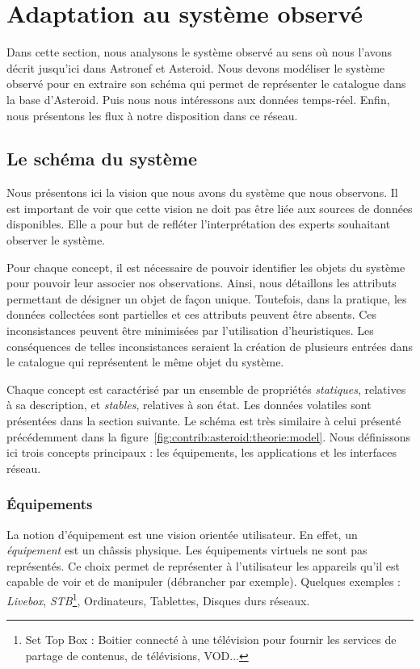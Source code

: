 \section{Adaptation au système observé}\label{sec:valid:domvision:systeme}
Dans cette section, nous analysons le système observé au sens où nous l'avons décrit jusqu'ici dans Astronef et Asteroid. Nous devons modéliser le système observé pour en extraire son schéma qui permet de représenter le catalogue dans la base d'Asteroid. Puis nous nous intéressons aux données temps-réel. Enfin, nous présentons les flux à notre disposition dans ce réseau.

\subsection{Le schéma du système}
Nous présentons ici la vision que nous avons du système que nous observons. Il est important de voir que cette vision ne doit pas être liée aux sources de données disponibles. Elle a pour but de refléter l'interprétation des experts souhaitant observer le système.

Pour chaque concept, il est nécessaire de pouvoir identifier les objets du système pour pouvoir leur associer nos observations. Ainsi, nous détaillons les attributs permettant de désigner un objet de façon unique. Toutefois, dans la pratique, les données collectées sont partielles et ces attributs peuvent être absents. Ces inconsistances peuvent être minimisées par l'utilisation d'heuristiques. Les conséquences de telles inconsistances seraient la création de plusieurs entrées dans le catalogue qui représentent le même objet du système.

Chaque concept est caractérisé par un ensemble de propriétés \textit{statiques}, relatives à sa description, et \textit{stables}, relatives à son état. Les données volatiles sont présentées dans la section suivante. Le schéma est très similaire à celui présenté précédemment dans la figure~\ref{fig:contrib:asteroid:theorie:model}. Nous définissons ici trois concepts principaux : les équipements, les applications et les interfaces réseau.

\subsubsection{Équipements}
La notion d'équipement est une vision orientée utilisateur. En effet, un \textit{équipement} est un châssis physique. Les équipements virtuels ne sont pas représentés. Ce choix permet de représenter à l'utilisateur les appareils qu'il est capable de voir et de manipuler (débrancher par exemple). Quelques exemples : \textit{Livebox}, \textit{STB}\footnote{Set Top Box : Boitier connecté à une télévision pour fournir les services de partage de contenus, de télévisions, VOD...}, Ordinateurs, Tablettes, Disques durs réseaux.

